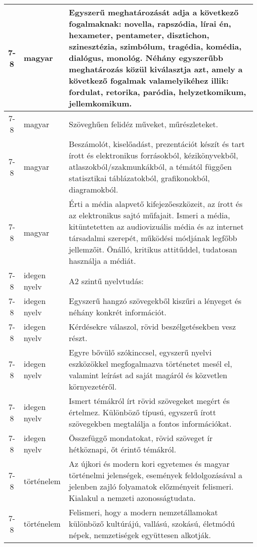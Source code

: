 \begin{small}
\begin{longtable}{c | p{2cm} |  p{11cm} }
              7-8 & magyar & Egyszerű meghatározását adja a következő fogalmaknak: novella, rapszódia, lírai én, hexameter, pentameter, disztichon, szinesztézia, szimbólum, tragédia, komédia, dialógus, monológ. Néhány egyszerűbb meghatározás közül kiválasztja azt, amely a következő fogalmak valamelyikéhez illik: fordulat, retorika, paródia, helyzetkomikum, jellemkomikum. \\ \hline
              7-8 & magyar & Szöveghűen felidéz műveket, műrészleteket. \\ \hline
              7-8 & magyar & Beszámolót, kiselőadást, prezentációt készít és tart írott és elektronikus forrásokból, kézikönyvekből, atlaszokból/szakmunkákból, a témától függően statisztikai táblázatokból, grafikonokból, diagramokból. \\ \hline
              7-8 & magyar & Érti a média alapvető kifejezőeszközeit, az írott és az elektronikus sajtó műfajait. Ismeri a média, kitüntetetten az audiovizuális média és az internet társadalmi szerepét, működési módjának legfőbb jellemzőit. Önálló, kritikus attitűddel, tudatosan használja a médiát. \\ \hline
              7-8 & idegen nyelv & A2 szintű nyelvtudás: \\ \hline
              7-8 & idegen nyelv & Egyszerű hangzó szövegekből kiszűri a lényeget és néhány konkrét információt. \\ \hline
              7-8 & idegen nyelv & Kérdésekre válaszol, rövid beszélgetésekben vesz részt. \\ \hline
              7-8 & idegen nyelv & Egyre bővülő szókinccsel, egyszerű nyelvi eszközökkel megfogalmazva történetet mesél el, valamint leírást ad saját magáról és közvetlen környezetéről. \\ \hline
              7-8 & idegen nyelv & Ismert témákról írt rövid szövegeket megért és értelmez. Különböző típusú, egyszerű írott szövegekben megtalálja a fontos információkat. \\ \hline
              7-8 & idegen nyelv & Összefüggő mondatokat, rövid szöveget ír hétköznapi, őt érintő témákról. \\ \hline
              7-8 & történelem & Az újkori és modern kori egyetemes és magyar történelmi jelenségek, események feldolgozásával a jelenben zajló folyamatok előzményeit felismeri. Kialakul a nemzeti azonosságtudata. \\ \hline
              7-8 & történelem & Felismeri, hogy a modern nemzetállamokat különböző kultúrájú, vallású, szokású, életmódú népek, nemzetiségek együttesen alkotják. \\ \hline

\end{longtable}
\end{small}
